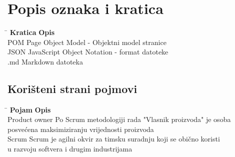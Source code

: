 \chapter*{Popis oznaka i kratica}\label{TOA}

\begin{tabbing}
\hspace{80pt}\=\kill
\textbf{Kratica} \> \textbf{Opis} \\ 
 POM \> Page Object Model - Objektni model stranice  \\ 
 JSON \> JavaScript Object Notation - format datoteke \\ 
 .md \> Markdown datoteka\\
 \end{tabbing} 


\section*{Korišteni strani pojmovi}
\begin{tabbing}
\hspace{100pt}\=\kill
\textbf{Pojam} \> \textbf{Opis} \\ 
Product owner \> Po Scrum metodologiji rada "Vlasnik proizvoda" je osoba\\ 
\> posvećena maksimiziranju vrijednosti proizvoda \\
Scrum \> Scrum je agilni okvir za timsku suradnju koji se obično koristi\\
\>u razvoju softvera i drugim industrijama
\end{tabbing} 